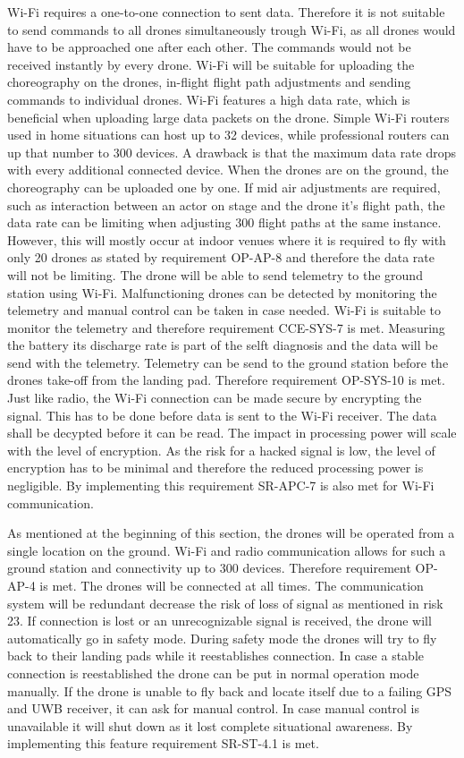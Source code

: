 Wi-Fi requires a one-to-one connection to sent data. Therefore it is not suitable to send commands to all drones simultaneously trough Wi-Fi, as all drones would have to be approached one after each other. The commands would not be received instantly by every drone. Wi-Fi will be suitable for uploading the choreography on the drones, in-flight flight path adjustments and sending commands to individual drones. Wi-Fi features a high data rate, which is beneficial when uploading large data packets on the drone. Simple Wi-Fi routers used in home situations can host up to 32 devices, while professional routers can up that number to 300 devices. A drawback is that the maximum data rate drops with every additional connected device. When the drones are on the ground, the choreography can be uploaded one by one. If mid air adjustments are required, such as interaction between an actor on stage and the drone it's flight path, the data rate can be limiting when adjusting 300 flight paths at the same instance. However, this will mostly occur at indoor venues where it is required to fly with only 20 drones as stated by requirement OP-AP-8 and therefore the data rate will not be limiting. The drone will be able to send telemetry to the ground station using Wi-Fi. Malfunctioning drones can be detected by monitoring the telemetry and manual control can be taken in case needed. Wi-Fi is suitable to monitor the telemetry and therefore requirement CCE-SYS-7 is met. Measuring the battery its discharge rate is part of the selft diagnosis and the data will be send with the telemetry. Telemetry can be send to the ground station before the drones take-off from the landing pad. Therefore requirement OP-SYS-10 is met. Just like radio, the Wi-Fi connection can be made secure by encrypting the signal. This has to be done before data is sent to the Wi-Fi receiver. The data shall be decypted before it can be read. The impact in processing power will scale with the level of encryption. As the risk for a hacked signal is low, the level of encryption has to be minimal and therefore the reduced processing power is negligible. By implementing this requirement SR-APC-7 is also met for Wi-Fi communication. 

As mentioned at the beginning of this section, the drones will be operated from a single location on the ground. Wi-Fi and radio communication allows for such a ground station and connectivity up to 300 devices. Therefore requirement OP-AP-4 is met. The drones will be connected at all times. The communication system will be redundant decrease the risk of loss of signal as mentioned in risk 23. If connection is lost or an unrecognizable signal is received, the drone will automatically go in safety mode. During safety mode the drones will try to fly back to their landing pads while it reestablishes connection. In case a stable connection is reestablished the drone can be put in normal operation mode manually. If the drone is unable to fly back and locate itself due to a failing GPS and UWB receiver, it can ask for manual control. In case manual control is unavailable it will shut down as it lost complete situational awareness. By implementing this feature requirement SR-ST-4.1 is met.



